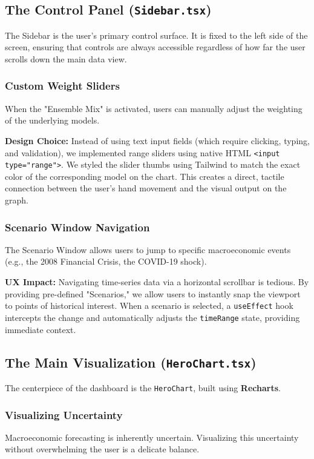 \documentclass[12pt]{article}
\begin{document}
\subsection{The Control Panel (\texttt{Sidebar.tsx})}
The Sidebar is the user's primary control surface. It is fixed to the left side of the screen, ensuring that controls are always accessible regardless of how far the user scrolls down the main data view.

\subsubsection{Custom Weight Sliders}
When the "Ensemble Mix" is activated, users can manually adjust the weighting of the underlying models. 

\textbf{Design Choice:} Instead of using text input fields (which require clicking, typing, and validation), we implemented range sliders using native HTML \texttt{<input type="range">}. We styled the slider thumbs using Tailwind to match the exact color of the corresponding model on the chart. This creates a direct, tactile connection between the user's hand movement and the visual output on the graph.

\subsubsection{Scenario Window Navigation}
The Scenario Window allows users to jump to specific macroeconomic events (e.g., the 2008 Financial Crisis, the COVID-19 shock). 

\textbf{UX Impact:} Navigating time-series data via a horizontal scrollbar is tedious. By providing pre-defined "Scenarios," we allow users to instantly snap the viewport to points of historical interest. When a scenario is selected, a \texttt{useEffect} hook intercepts the change and automatically adjusts the \texttt{timeRange} state, providing immediate context.

\subsection{The Main Visualization (\texttt{HeroChart.tsx})}
The centerpiece of the dashboard is the \texttt{HeroChart}, built using \textbf{Recharts}. 

\subsubsection{Visualizing Uncertainty}
Macroeconomic forecasting is inherently uncertain. Visualizing this uncertainty without overwhelming the user is a delicate balance.
\end{document}
